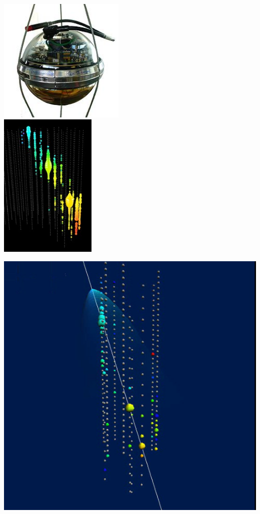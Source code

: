 \Tr
{}
\begin{center}
\includegraphics[keepaspectratio,height=6cm]{dom}\\[3mm]
\includegraphics[keepaspectratio,height=7cm]{event}
\end{center}
%
\newpage
%
\begin{center}
\includegraphics[keepaspectratio,width=13.5cm]{cone}
\end{center}

